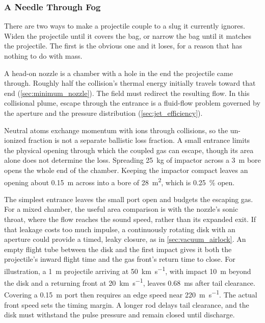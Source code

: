\documentclass{article}
\begin{document}
\subsubsection{A Needle Through Fog}\label{sec:needle_through_fog}
There are two ways to make a projectile couple to a slug it currently ignores. Widen the projectile until it covers the bag, or narrow the bag until it matches the projectile. The first is the obvious one and it loses, for a reason that has nothing to do with mass.

A head-on nozzle is a chamber with a hole in the end the projectile came through. Roughly half the collision's thermal energy initially travels toward that end (\autoref{sec:minimum_nozzle}). The field must redirect the resulting flow. In this collisional plume, escape through the entrance is a fluid-flow problem governed by the aperture and the pressure distribution (\autoref{sec:jet_efficiency}).

Neutral atoms exchange momentum with ions through collisions, so the un-ionized fraction is not a separate ballistic loss fraction. A small entrance limits the physical opening through which the coupled gas can escape, though its area alone does not determine the loss. Spreading \SI{25}{\kilogram} of impactor across a \SI{3}{\meter} bore opens the whole end of the chamber. Keeping the impactor compact leaves an opening about \SI{0.15}{\meter} across into a bore of \SI{28}{\square\meter}, which is \SI{0.25}{\percent} open.

The simplest entrance leaves the small port open and budgets the escaping gas. For a mixed chamber, the useful area comparison is with the nozzle's sonic throat, where the flow reaches the sound speed, rather than its expanded exit. If that leakage costs too much impulse, a continuously rotating disk with an aperture could provide a timed, leaky closure, as in \autoref{sec:vacuum_airlock}. An empty flight tube between the disk and the first impact gives it both the projectile's inward flight time and the gas front's return time to close. For illustration, a \SI{1}{\meter} projectile arriving at \SI{50}{\kilo\meter\per\second}, with impact \SI{10}{\meter} beyond the disk and a returning front at \SI{20}{\kilo\meter\per\second}, leaves \SI{0.68}{\milli\second} after tail clearance. Covering a \SI{0.15}{\meter} port then requires an edge speed near \SI{220}{\meter\per\second}. The actual front speed sets the timing margin. A longer rod delays tail clearance, and the disk must withstand the pulse pressure and remain closed until discharge.
\end{document}
